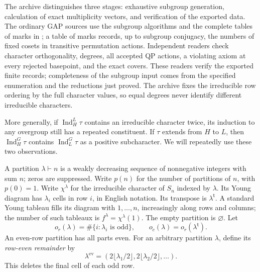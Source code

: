 \documentclass[11pt]{article}
\numberwithin{equation}{section}
\theoremstyle{definition}
\DeclareMathOperator{\Ind}{Ind}
\newcommand{\emptypar}{\varnothing}
\newcommand{\transpose}{\mathsf t}
\begin{document}
The archive \cite{ZhangData} distinguishes three stages: exhaustive subgroup generation, calculation of exact multiplicity vectors, and verification of the exported data.
The ordinary GAP sources use the subgroup algorithms and the complete tables of marks in \cite{GAP,CTblLib,TomLib}; a table of marks records, up to subgroup conjugacy, the numbers of fixed cosets in transitive permutation actions.
Independent readers check character orthogonality, degrees, all accepted QP actions, a violating axiom at every rejected basepoint, and the exact covers.
These readers verify the exported finite records; completeness of the subgroup input comes from the specified enumeration and the reductions just proved.
The archive fixes the irreducible row ordering by the full character values, so equal degrees never identify different irreducible characters.

More generally, if \(\Ind_H^L\tau\) contains an irreducible character twice, its induction to any overgroup still has a repeated constituent.
If \(\tau\) extends from \(H\) to \(L\), then \(\Ind_H^G\tau\) contains \(\Ind_L^G\tau\) as a positive subcharacter.
We will repeatedly use these two observations.

A partition \(\lambda\vdash n\) is a weakly decreasing sequence of nonnegative integers with sum \(n\); zeros are suppressed.
Write \(p(n)\) for the number of partitions of \(n\), with \(p(0)=1\).
Write \(\chi^\lambda\) for the irreducible character of \(S_n\) indexed by \(\lambda\).
Its Young diagram has \(\lambda_i\) cells in row \(i\), in English notation.
Its transpose is \(\lambda^\transpose\).
A standard Young tableau fills its diagram with \(1,\ldots,n\), increasingly along rows and columns; the number of such tableaux is \(f^\lambda=\chi^\lambda(1)\).
The empty partition is \(\emptypar\).
Let
\[
 o_r(\lambda)=\#\{i:\lambda_i\text{ is odd}\},
 \qquad o_c(\lambda)=o_r(\lambda^\transpose).
\]
An even-row partition has all parts even.
For an arbitrary partition \(\lambda\), define its \emph{row-even remainder} by
\[
 \lambda^{\mathrm{ev}}=(2\lfloor\lambda_1/2\rfloor,2\lfloor\lambda_2/2\rfloor,\ldots).
\]
This deletes the final cell of each odd row.
\end{document}

